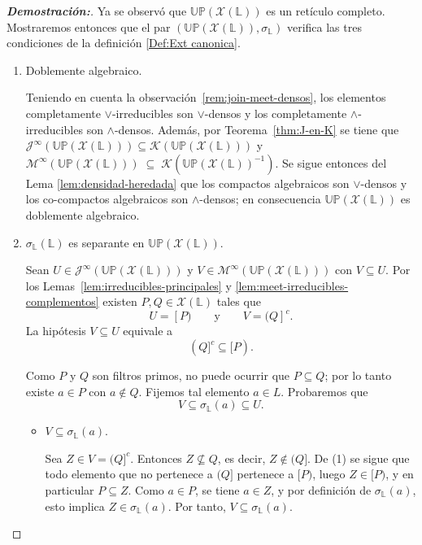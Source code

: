 \documentclass[12pt]{book}
\newcommand{\Up}{\mathbb{UP}}
\begin{document}
\begin{proof}[\textbf{Demostración:}]
Ya se observó que $\Up(\mathcal{X}(\mathbb L))$ es un retículo completo. Mostraremos entonces que el par $\left(\Up(\mathcal{X}(\mathbb{L})),\sigma_{\mathbb{L}} \right)$ verifica las tres condiciones de la definición \ref{Def:Ext canonica}.

\begin{enumerate}
    \item Doblemente algebraico.
    
Teniendo en cuenta la observación~\ref{rem:join-meet-densos}, los elementos completamente $\vee$-irreducibles son $\vee$-densos y los completamente $\wedge$-irreducibles son $\wedge$-densos. Además, por Teorema~\ref{thm:J-en-K} se tiene que
$\mathcal J^\infty(\Up(\mathcal{X}(\mathbb L)))\subseteq\mathcal K(\Up(\mathcal{X}(\mathbb L)))$  y $
\mathcal M^\infty(\Up(\mathcal{X}(\mathbb L)))\;\subseteq\; \mathcal{K}(\Up(\mathcal{X}(\mathbb L))^{-1})$. Se sigue entonces del Lema \ref{lem:densidad-heredada} que los compactos algebraicos son $\vee$-densos y los co-compactos algebraicos son $\wedge$-densos;
en consecuencia $\Up(\mathcal{X}(\mathbb L))$ es doblemente algebraico.


\item $\sigma_{\mathbb{L}}(\mathbb L)$ es separante en $\Up(\mathcal{X}(\mathbb L))$.

Sean \(U\in\mathcal J^\infty(\Up(\mathcal{X}(\mathbb L)))\) y 
\(V\in\mathcal M^\infty(\Up(\mathcal{X}(\mathbb L)))\) con \(V \subseteq U\).
Por los Lemas~\ref{lem:irreducibles-principales} y
\ref{lem:meet-irreducibles-complementos} existen
\(P,Q\in\mathcal X(\mathbb L)\) tales que
\[
U=[P)
\qquad\text{y}\qquad
V=(Q]^{c}.
\]
La hipótesis \(V\subseteq U\) equivale a
\[
(Q]^{c} \subseteq [P).
\tag{1}
\]

Como \(P\) y \(Q\) son filtros primos, no puede ocurrir que \(P\subseteq Q\);
por lo tanto existe \(a\in P\) con \(a\notin Q\).
Fijemos tal elemento \(a\in L\).
Probaremos que
\[
V \subseteq \sigma_{\mathbb{L}}(a)\subseteq U.
\]

\begin{itemize}
\item[a)] \(V\subseteq \sigma_{\mathbb{L}}(a)\).

Sea \(Z\in V=(Q]^c\).
Entonces \(Z\nsubseteq Q\), es decir,
\(Z\notin (Q]\).
De (1) se sigue que todo elemento que no pertenece a \((Q]\)
pertenece a \([P)\), luego \(Z\in [P)\),
y en particular \(P\subseteq Z\).
Como \(a\in P\), se tiene \(a\in Z\),
y por definición de \(\sigma_{\mathbb{L}}(a)\),
esto implica \(Z\in \sigma_{\mathbb{L}}(a)\).
Por tanto, \(V\subseteq\sigma_{\mathbb{L}}(a)\).


\end{itemize}
\end{enumerate}
\end{proof}
\end{document}

